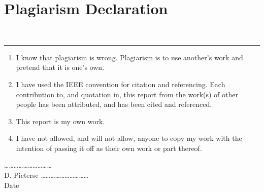 {\smallest\chapter*{Plagiarism Declaration}\label{chap:Plagiarism Declaration}}\\
\hrule

\vskip 10mm
\begin{enumerate}
\item I know that plagiarism is wrong. Plagiarism is to use another's work and pretend that it is one's own.
\item I have used the IEEE convention for citation and referencing. Each contribution to, and quotation in, this report from the work(s) of other people has been attributed, and has been cited and referenced.
\item This report is my own work.
\item I have not allowed, and will not allow, anyone to copy my work with the intention of passing it off as their own work or part thereof.
\end{enumerate}

\vskip 15mm
\ldots\ldots\ldots\ldots\ldots\ldots\ldots\ldots\ldots\ldots
\\D. Pieterse
\vskip12mm
\ldots\ldots\ldots\ldots\ldots\ldots\ldots\ldots\ldots\ldots
\\Date

\fancyfoot[C]{\thepage}
\pagestyle{plain}
\newpage
